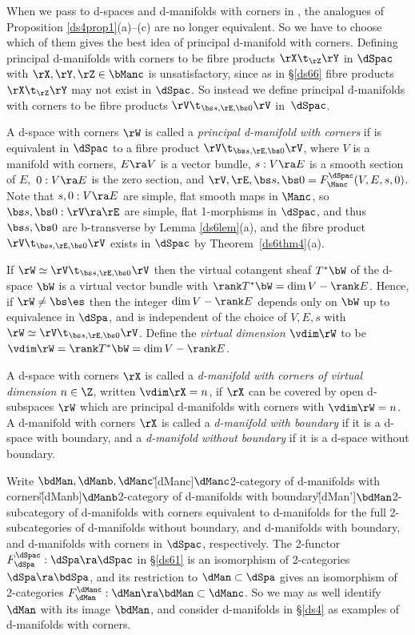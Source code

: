 \documentclass{article}
\begin{document}
When we pass to d-spaces and d-manifolds with corners in \cite[\S
7.1]{Joyc6}, the analogues of Proposition \ref{ds4prop1}(a)--(c) are
no longer equivalent. So we have to choose which of them gives the
best idea of principal d-manifold with corners. Defining principal
d-manifolds with corners to be fibre products $\rX\t_\rZ\rY$ in
$\dSpac$ with $\rX,\rY,\rZ\in\bManc$ is unsatisfactory, since as in
\S\ref{ds66} fibre products $\rX\t_\rZ\rY$ may not exist in
$\dSpac$. So instead we define principal d-manifolds with corners to
be fibre products $\rV\t_{\bs s,\rE,\bs 0}\rV$ in~$\dSpac$.

\begin{dfn} A d-space with corners $\rW$ is called a {\it principal
d-manifold with corners\/} if is
equivalent in $\dSpac$ to a fibre product $\rV\t_{\bs s,\rE,\bs
0}\rV$, where $V$ is a manifold with corners, $E\ra V$ is a vector
bundle, $s:V\ra E$ is a smooth section of $E,$ $0:V\ra E$ is the
zero section, and $\rV,\rE,\bs s,\bs 0=F_\Manc^\dSpac(V,E,s,0)$.
Note that $s,0:V\ra E$ are simple, flat smooth maps in $\Manc$, so
$\bs s,\bs 0:\rV\ra\rE$ are simple, flat 1-morphisms in $\dSpac$,
and thus $\bs s,\bs 0$ are b-transverse by Lemma \ref{ds6lem}(a),
and the fibre product $\rV\t_{\bs s,\rE,\bs 0}\rV$ exists in
$\dSpac$ by Theorem~\ref{ds6thm4}(a).

If $\rW\simeq\rV\t_{\bs s,\rE,\bs 0}\rV$ then the virtual cotangent
sheaf $T^*\bW$ of the d-space $\bW$ is a virtual vector bundle with
$\rank T^*\bW=\dim V-\rank E$. Hence, if $\rW\ne\bs\es$ then the
integer $\dim V-\rank E$ depends only on $\bW$ up to equivalence in
$\dSpa$, and is independent of the choice of $V,E,s$ with
$\rW\simeq\rV\t_{\bs s,\rE,\bs 0}\rV$. Define the {\it virtual
dimension\/} $\vdim\rW$
to be~$\vdim\rW=\rank T^*\bW=\dim V-\rank E$.

A d-space with corners $\rX$ is called a {\it d-manifold with
corners of virtual dimension\/} $n\in\Z$, written $\vdim\rX=n$, if
$\rX$ can be covered by open d-subspaces $\rW$ which are principal
d-manifolds with corners with $\vdim\rW=n$. A d-manifold with
corners $\rX$ is called a {\it d-manifold with
boundary\/} if it is a d-space with
boundary, and a {\it d-manifold without boundary\/} if it is a
d-space without boundary.

Write $\bdMan,\dManb,\dManc$\G[dManc]{$\dManc$}{2-category of
d-manifolds with corners}\G[dManb]{$\dManb$}{2-category of
d-manifolds with boundary}\G[dMan']{$\bdMan$}{2-subcategory of
d-manifolds with corners equivalent to d-manifolds} for the full
2-subcategories of d-manifolds without boundary, and d-manifolds
with boundary, and d-manifolds with corners in $\dSpac$,
respectively. The 2-functor $F_\dSpa^\dSpac:\dSpa\ra\dSpac$ in
\S\ref{ds61} is an isomorphism of 2-categories $\dSpa\ra\bdSpa$, and
its restriction to $\dMan\subset\dSpa$ gives an isomorphism of
2-categories $F_\dMan^\dManc:\dMan\ra\bdMan\subset\dManc$. So we may
as well identify $\dMan$ with its image $\bdMan$, and consider
d-manifolds in \S\ref{ds4} as examples of d-manifolds with
corners.


\end{dfn}
\end{document}
